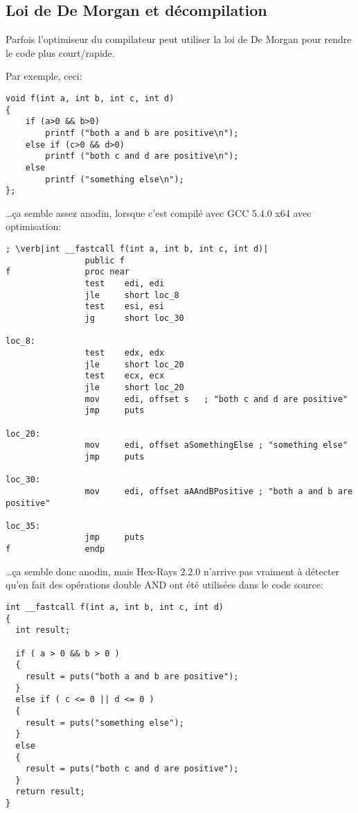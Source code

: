 \subsection{Loi de De Morgan et décompilation}

Parfois l'optimiseur du compilateur peut utiliser la loi de De Morgan pour rendre
le code plus court/rapide.

Par exemple, ceci:

\begin{lstlisting}[style=customc]
void f(int a, int b, int c, int d)
{
	if (a>0 && b>0)
		printf ("both a and b are positive\n");
	else if (c>0 && d>0)
		printf ("both c and d are positive\n");
	else
		printf ("something else\n");
};
\end{lstlisting}

\dots ça semble assez anodin, lorsque c'est compilé avec GCC 5.4.0 x64 avec optimisation:

\begin{lstlisting}[style=customasmx86]
; \verb|int __fastcall f(int a, int b, int c, int d)|
                public f
f               proc near
                test    edi, edi
                jle     short loc_8
                test    esi, esi
                jg      short loc_30

loc_8:
                test    edx, edx
                jle     short loc_20
                test    ecx, ecx
                jle     short loc_20
                mov     edi, offset s   ; "both c and d are positive"
                jmp     puts

loc_20:
                mov     edi, offset aSomethingElse ; "something else"
                jmp     puts

loc_30:
                mov     edi, offset aAAndBPositive ; "both a and b are positive"

loc_35:
                jmp     puts
f               endp
\end{lstlisting}

\dots ça semble donc anodin, mais Hex-Rays 2.2.0 n'arrive pas vraiment à détecter
qu'en fait des opérations double AND ont été utilisées dans le code source:

\begin{lstlisting}[style=customc]
int __fastcall f(int a, int b, int c, int d)
{
  int result;

  if ( a > 0 && b > 0 )
  {
    result = puts("both a and b are positive");
  }
  else if ( c <= 0 || d <= 0 )
  {
    result = puts("something else");
  }
  else
  {
    result = puts("both c and d are positive");
  }
  return result;
}
\end{lstlisting}

